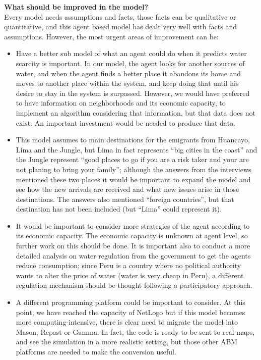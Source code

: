 \documentclass{article}
\begin{document}
{\bf What should be improved in the model?} \\
Every model needs assumptions and facts, those facts can be qualitative or quantitative, and this agent based model has dealt very well with facts and assumptions. However, the most urgent areas of improvement can be:
\begin{itemize}
\item Have a better sub model of what an agent could do when it predicts water scarcity is important. In our model, the agent looks for another sources of water, and when the agent finds a better place it abandons its home and moves to another place within the system, and keep doing that until his desire to stay in the system is surpassed. However, we would have preferred to have information on neighborhoods and its economic capacity, to implement an algorithm considering that information, but that data does not exist. An important investment would be needed to produce that data.
\item This model assumes to main destinations for the emigrants from Huancayo, Lima and the Jungle, but Lima in fact represents ``big cities in the coast'' and the Jungle represent ``good places to go if you are a risk taker and your are not planing to bring your family''; although the answers from the interviews mentioned these two places it would be important to expand the model and see how the new arrivals are received and what new issues arise in those destinations. The answers also mentioned ``foreign countries'', but that destination has not been included (but ``Lima'' could represent it).
\item It would be important to consider more strategies of the agent according to its economic capacity. The economic capacity is unknown at agent level, so further work on this should be done. It is important also to conduct a more detailed analysis on water regulation from the government to get the agents reduce consumption; since Peru is a country where no political authority wants to alter the price of water (water is very cheap in Peru), a different regulation mechanism should be thought following a participatory approach.

\item A different programming platform could be important to consider. At this point, we have reached the capacity of NetLogo but if this model becomes more computing-intensive, there is clear need to migrate the model into Mason, Repast or Gamma. In fact, the code is ready to be sent to real maps, and see the simulation in a more realistic setting, but those other ABM platforms are needed to make the conversion useful. 
\end{itemize}
\end{document}
